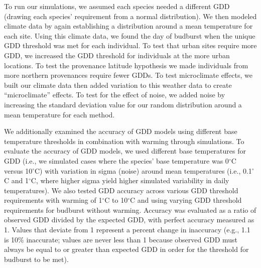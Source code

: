 \documentclass{article}\usepackage[]{graphicx}\usepackage[]{color}
\begin{document}
To run our simulations, we assumed each species needed a different GDD (drawing each species' requirement from a normal distribution). We then modeled climate data by again establishing a distribution around a mean temperature for each site. Using this climate data, we found the day of budburst when the unique GDD threshold was met for each individual. To test that urban sites require more GDD, we increased the GDD threshold for individuals at the more urban locations. To test the provenance latitude hypothesis we made individuals from more northern provenances require fewer GDDs. To test microclimate effects, we built our climate data then added variation to this weather data to create ``microclimate'' effects.  To test for the effect of noise, we added noise by increasing the standard deviation value for our random distribution around a mean temperature for each method.

We additionally examined the accuracy of GDD models using different base temperature thresholds in combination with warming through simulations. To evaluate the accuracy of GDD models, we used different base temperatures for GDD (i.e., we simulated cases where the species' base temperature was 0$^{\circ}$C versus 10$^{\circ}$C) with variation in sigma (noise) around mean temperatures (i.e., 0.1$^{\circ}$C and 1$^{\circ}$C, where higher sigma yield higher simulated variability in daily temperatures). We also tested GDD accuracy across various GDD threshold requirements with warming of 1$^{\circ}$C to 10$^{\circ}$C and using varying GDD threshold requirements for budburst without warming. Accuracy was evaluated as a ratio of observed GDD divided by the expected GDD, with perfect accuracy measured as 1. Values that deviate from 1 represent a percent change in inaccuracy (e.g., 1.1 is 10\% inaccurate; values are never less than 1 because observed GDD must always be equal to or greater than expected GDD in order for the threshold for budburst to be met).
\end{document}
